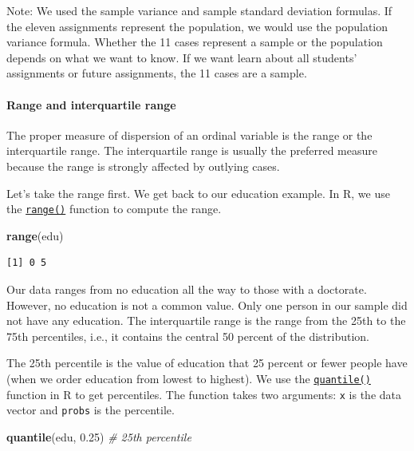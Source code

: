 \documentclass[]{article}
\newenvironment{Shaded}{\begin{snugshade}}{\end{snugshade}}
\newcommand{\KeywordTok}[1]{\textcolor[rgb]{0.13,0.29,0.53}{\textbf{#1}}}
\newcommand{\FloatTok}[1]{\textcolor[rgb]{0.00,0.00,0.81}{#1}}
\newcommand{\CommentTok}[1]{\textcolor[rgb]{0.56,0.35,0.01}{\textit{#1}}}
\newcommand{\NormalTok}[1]{#1}
\let\oldparagraph\paragraph
\renewcommand{\paragraph}[1]{\oldparagraph{#1}\mbox{}}
\theoremstyle{definition}
\theoremstyle{definition}
\theoremstyle{definition}
\theoremstyle{remark}
\begin{document}
Note: We used the sample variance and sample standard deviation
formulas. If the eleven assignments represent the population, we would
use the population variance formula. Whether the 11 cases represent a
sample or the population depends on what we want to know. If we want
learn about all students' assignments or future assignments, the 11
cases are a sample.

\paragraph{Range and interquartile
range}\label{range-and-interquartile-range}

The proper measure of dispersion of an ordinal variable is the range or
the interquartile range. The interquartile range is usually the
preferred measure because the range is strongly affected by outlying
cases.

Let's take the range first. We get back to our education example. In R,
we use the \href{http://bit.ly/R_range}{\texttt{range()}} function to
compute the range.

\begin{Shaded}
\begin{Highlighting}[]
\KeywordTok{range}\NormalTok{(edu)}
\end{Highlighting}
\end{Shaded}

\begin{verbatim}
[1] 0 5
\end{verbatim}

Our data ranges from no education all the way to those with a doctorate.
However, no education is not a common value. Only one person in our
sample did not have any education. The interquartile range is the range
from the 25th to the 75th percentiles, i.e., it contains the central 50
percent of the distribution.

The 25th percentile is the value of education that 25 percent or fewer
people have (when we order education from lowest to highest). We use the
\href{http://bit.ly/R_quantile}{\texttt{quantile()}} function in R to
get percentiles. The function takes two arguments: \texttt{x} is the
data vector and \texttt{probs} is the percentile.

\begin{Shaded}
\begin{Highlighting}[]
\KeywordTok{quantile}\NormalTok{(edu, }\FloatTok{0.25}\NormalTok{) }\CommentTok{# 25th percentile}
\end{Highlighting}
\end{Shaded}
\end{document}
